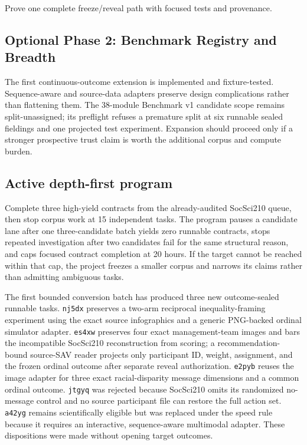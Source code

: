\documentclass[11pt]{article}
\begin{document}
Prove one complete freeze/reveal path with focused tests and provenance.

\subsection*{Optional Phase 2: Benchmark Registry and Breadth}

The first continuous-outcome extension is implemented and fixture-tested. Sequence-aware and source-data adapters preserve design complications rather than flattening them. The 38-module Benchmark v1 candidate scope remains split-unassigned; its preflight refuses a premature split at six runnable sealed fieldings and one projected test experiment. Expansion should proceed only if a stronger prospective trust claim is worth the additional corpus and compute burden.

\subsection*{Active depth-first program}

Complete three high-yield contracts from the already-audited SocSci210 queue, then stop corpus work at 15 independent tasks. The program pauses a candidate lane after one three-candidate batch yields zero runnable contracts, stops repeated investigation after two candidates fail for the same structural reason, and caps focused contract completion at 20 hours. If the target cannot be reached within that cap, the project freezes a smaller corpus and narrows its claims rather than admitting ambiguous tasks.

The first bounded conversion batch has produced three new outcome-sealed runnable tasks. 
\texttt{nj5dx} preserves a two-arm reciprocal inequality-framing experiment using the exact source infographics and a generic PNG-backed ordinal simulator adapter. 
\texttt{es4xw} preserves four exact management-team images and bars the incompatible SocSci210 reconstruction from scoring; a recommendation-bound source-SAV reader projects only participant ID, weight, assignment, and the frozen ordinal outcome after separate reveal authorization. 
\texttt{e2pyb} reuses the image adapter for three exact racial-disparity message dimensions and a common ordinal outcome. 
\texttt{jtgyq} was rejected because SocSci210 omits its randomized no-message control and no source participant file can restore the full action set. 
\texttt{a42yg} remains scientifically eligible but was replaced under the speed rule because it requires an interactive, sequence-aware multimodal adapter. These dispositions were made without opening target outcomes.
\end{document}
